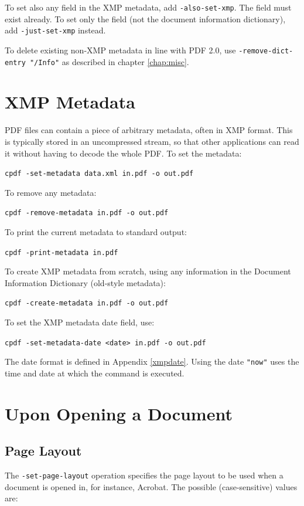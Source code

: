 \documentclass{book}
\begin{document}
To set also any field in the XMP metadata, add \texttt{-also-set-xmp}. The field must exist already. To set only the field (not the document information dictionary), add \texttt{-just-set-xmp} instead.

To delete existing non-XMP metadata in line with PDF 2.0, use \texttt{-remove-dict-entry "/Info"} as described in chapter \ref{chap:misc}.

  \section{XMP Metadata}
  PDF files can contain a piece of arbitrary metadata, often in XMP format.
This is typically stored in an uncompressed stream, so that other applications
can read it without having to decode the whole PDF. To set the metadata:
  \begin{framed}
    \noindent\small\verb!cpdf -set-metadata data.xml in.pdf -o out.pdf!
  \end{framed}
  \noindent To remove any metadata:
  \begin{framed}
    \noindent\small\verb!cpdf -remove-metadata in.pdf -o out.pdf!
  \end{framed}
  \noindent To print the current metadata to standard output:
  \begin{framed}
    \noindent\small\verb!cpdf -print-metadata in.pdf!
  \end{framed}
  \noindent To create XMP metadata from scratch, using any information in the Document Information Dictionary (old-style metadata):
  \begin{framed}
    \noindent\small\verb!cpdf -create-metadata in.pdf -o out.pdf!
  \end{framed}
  \noindent To set the XMP metadata date field, use:
  \begin{framed}
    \noindent\small\verb!cpdf -set-metadata-date <date> in.pdf -o out.pdf!
  \end{framed}
\noindent The date format is defined in Appendix \ref{xmpdate}. Using the date \texttt{"now"} uses the time and date
at which the command is executed.


\section{Upon Opening a Document}

  \subsection{Page Layout}
  The \texttt{-set-page-layout} operation specifies the page layout to be used
when a document is opened in, for instance, Acrobat. The possible
(case-sensitive) values are:
\end{document}
